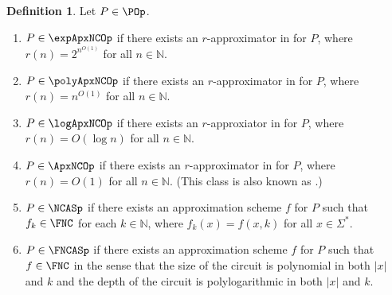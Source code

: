 \documentclass[]{article}
\theoremstyle{plain}
\theoremstyle{definition}
\newtheorem{definition}{Definition}
\begin{document}
\begin{definition}\label{def:ncxprime}
  Let $P\in\POp$.
  \begin{enumerate}
  \item $P\in\expApxNCOp$ if there exists an $r$-approximator in \FNC{} for $P$, where $r(n)=2^{n^{O(1)}}$ for all $n\in\mathbb{N}$.
  \item $P\in\polyApxNCOp$ if there exists an $r$-approximator in \FNC{} for $P$, where $r(n)=n^{O(1)}$ for all $n\in\mathbb{N}$.
  \item $P\in\logApxNCOp$ if there exists an $r$-approxiator in \FNC{} for $P$, where $r(n)=O(\log n)$ for all $n\in\mathbb{N}$.
  \item $P\in\ApxNCOp$ if there exists an $r$-approximator in \FNC{} for $P$, where $r(n)=O(1)$ for all $n\in\mathbb{N}$.
    (This class is also known as \NCX.)
  \item $P\in\NCASp$ if there exists an approximation scheme $f$ for $P$ such that $f_k\in\FNC$ for each $k\in\mathbb{N}$, where $f_k(x)=f(x, k)$ for all $x\in\Sigma^*$.
  \item $P\in\FNCASp$ if there exists an approximation scheme $f$ for $P$ such that $f\in\FNC$ in the sense that the size of the circuit is polynomial in both $|x|$ and $k$ and the depth of the circuit is polylogarithmic in both $|x|$ and $k$.
  \end{enumerate}
\end{definition}
\end{document}
